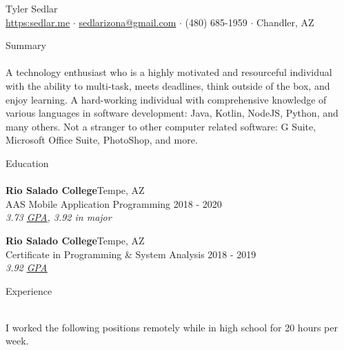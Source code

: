 \documentclass[a4paper]{article}
\newcommand{\lineunder} {
    \vspace*{-8pt} \\
    \hspace*{-18pt} \hrulefill \\
}
\newcommand{\header} [1] {
    {\hspace*{-18pt}\vspace*{6pt} {#1}}
    \vspace*{-6pt} \lineunder
}
\newcommand{\textslash}{/}
\begin{document}
\vspace*{-40pt}
\setul{}{0.25pt}

\vspace*{-10pt}
\begin{center}
	{\Huge {Tyler Sedlar}}\\
	\href{https://sedlar.me/}{https:\raisebox{1.1pt}{\textsc{\textbf{\textslash \textslash}}}sedlar.me} $\cdot$ \href{mailto:sedlarizona@gmail.com}{sedlarizona@gmail.com} $\cdot$ (480) 685-1959 $\cdot$ Chandler, AZ\\
\end{center}

\header{Summary}
A technology enthusiast who is a highly motivated and resourceful individual with the ability to multi-task, meets deadlines, think outside of the box, and enjoy learning.
A hard-working individual with comprehensive knowledge of various languages in software development: Java, Kotlin, NodeJS, Python, and many others.
Not a stranger to other computer related software: G Suite, Microsoft Office Suite, PhotoShop, and more.
\vspace{2mm}

\header{Education}
\textbf{Rio Salado College}\hfill Tempe, AZ\\
AAS Mobile Application Programming \hfill 2018 - 2020\\
\textit{3.73 \href{https://docs.google.com/spreadsheets/d/143DmVdsyjRVbH1ftcySxflvuNjioncAvJpj0vFbzpA8/edit?usp=sharing}{\ul{GPA}}, 3.92 in major}\\

\vspace{2mm}

\textbf{Rio Salado College}\hfill Tempe, AZ\\
Certificate in Programming \& System Analysis \hfill 2018 - 2019\\
\textit{3.92 \href{https://docs.google.com/spreadsheets/d/143DmVdsyjRVbH1ftcySxflvuNjioncAvJpj0vFbzpA8/edit?usp=sharing}{\ul{GPA}}}\\
\vspace{2mm}

\header{Experience}
\vspace{1mm}

I worked the following positions remotely while in high school for 20 hours per week.

\vspace{1mm}
\end{document}

